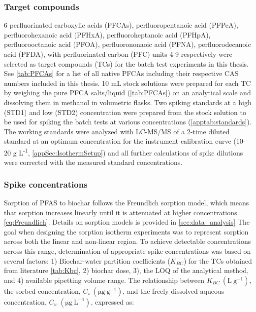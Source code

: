 \subsubsection{Target compounds}\label{sec:PFCAanalytic}
6 perfluorinated carboxylic acids (PFCAs), perfluoropentanoic acid (PFPeA), perfluorohexanoic acid (PFHxA), perfluoroheptanoic acid (PFHpA), perfluorooctanoic acid (PFOA), perfluorononaoic acid (PFNA), perfluorodecanoic acid (PFDA), with perfluorinated carbon (PFC) units 4-9 respectively were selected as target compounds (TCs) for the batch test experiments in this thesis. See \cref{tab:PFCAs} for a list of all native PFCAs including their respective CAS numbers included in this thesis. 10 mL stock solutions were prepared for each TC by weighing the pure PFCA salts/liquid (\cref{tab:PFCAs}) on an analytical scale and dissolving them in methanol in volumetric flasks. Two spiking standards at a high (STD1) and low (STD2) concentration were prepared from the stock solution to be used for spiking the batch tests at various concentrations (\cref{apptab:standards}). The working standards were analyzed with LC-MS/MS of a 2-time diluted standard at an optimum concentration for the instrument calibration curve (10-20 \textmu g L\textsuperscript{-1}, \cref{appSec:IsothermSetup}) and all further calculations of spike dilutions were corrected with the measured standard concentrations.



\subsubsection{Spike concentrations}
Sorption of PFAS to biochar follows the Freundlich sorption model, which means that sorption increases linearly until it is attenuated at higher concentrations \cref{eq:Freundlich}. Details on sorption models is provided in \cref{sec:data_analysis} The goal when designing the sorption isotherm experiments was to represent sorption across both the linear and non-linear region. To achieve detectable concentrations across this range, determination of appropriate spike concentrations was based on several factors: 1) Biochar-water partition coefficients ($K_{BC}$) for the TCs obtained from literature \cite{Xiao2017} \cref{tab:Kbc}, 2) biochar dose, 3), the LOQ of the analytical method, and 4) available pipetting volume range. The relationship between $K_{BC}~\mathrm{(L~g^{-1})}$, the sorbed concentration, $C_s~\mathrm{(\mu g~g^{-1})}$, and the freely dissolved aqueous concentration, $C_w~\mathrm{(\mu g~L^{-1})}$, expressed as:

